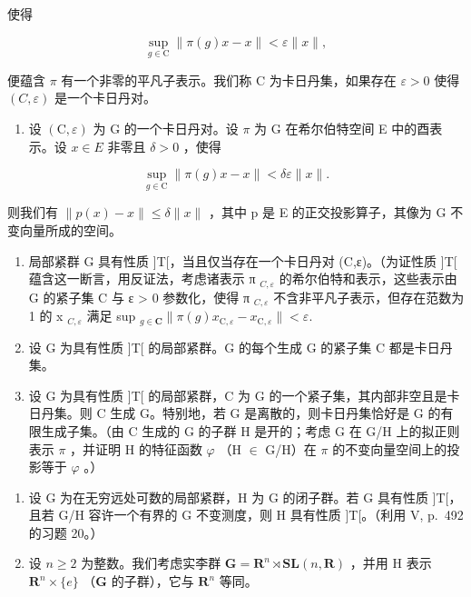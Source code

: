 使得

\[
\sup _ {g \in \mathrm{C}} \| \pi (g) x - x \| <   \varepsilon \| x \|,
\]

  便蕴含 \(\pi\) 有一个非零的平凡子表示。我们称 C 为卡日丹集，如果存在 \(\varepsilon > 0\) 使得 \((C, \varepsilon)\) 是一个卡日丹对。

\begin{enumerate}
\def\labelenumi{\alph{enumi})}
\tightlist
\item
  设 \((\mathrm{C}, \varepsilon)\) 为 G 的一个卡日丹对。设 \(\pi\) 为 G 在希尔伯特空间 E 中的酉表示。设 \(x \in E\) 非零且 \(\delta > 0\) ，使得
\end{enumerate}

\[
\sup _ {g \in \mathrm{C}} \| \pi (g) x - x \| <   \delta \varepsilon \| x \|.
\]

则我们有 \(\|p(x)-x\|\leqslant\delta\|x\|\) ，其中 p 是 E 的正交投影算子，其像为 G 不变向量所成的空间。

\begin{enumerate}
\def\labelenumi{\alph{enumi})}
\setcounter{enumi}{1}
\item
  局部紧群 G 具有性质 ]T[，当且仅当存在一个卡日丹对 (C,ε)。（为证性质 ]T[ 蕴含这一断言，用反证法，考虑诸表示 π \(_{C,\varepsilon}\) 的希尔伯特和表示，这些表示由 G 的紧子集 C 与 ε > 0 参数化，使得 π \(_{C,\varepsilon}\) 不含非平凡子表示，但存在范数为 1 的 x \(_{C,\varepsilon}\) 满足 sup \(_{g\in\mathbf{C}}\|\pi(g)x_{\mathrm{C},\varepsilon}-x_{\mathrm{C},\varepsilon}\|<\varepsilon.\)
\item
  设 G 为具有性质 ]T[ 的局部紧群。G 的每个生成 G 的紧子集 C 都是卡日丹集。
\item
  设 G 为具有性质 ]T[ 的局部紧群，C 为 G 的一个紧子集，其内部非空且是卡日丹集。则 C 生成 G。特别地，若 G 是离散的，则卡日丹集恰好是 G 的有限生成子集。（由 C 生成的 G 的子群 H 是开的；考虑 G 在 G/H 上的拟正则表示 \(\pi\) ，并证明 H 的特征函数 \(\varphi\) （H \(\in\) G/H）在 \(\pi\) 的不变向量空间上的投影等于 \(\varphi\) 。）
\end{enumerate}

\begin{enumerate}
\def\labelenumi{\arabic{enumi})}
\setcounter{enumi}{15}
\item
  设 G 为在无穷远处可数的局部紧群，H 为 G 的闭子群。若 G 具有性质 ]T[，且若 G/H 容许一个有界的 G 不变测度，则 H 具有性质 ]T[。（利用 V, p.~492 的习题 20。）
\item
  设 \(n \geqslant 2\) 为整数。我们考虑实李群 \(\mathbf{G} = \mathbf{R}^n \rtimes \mathbf{SL}(n, \mathbf{R})\) ，并用 H 表示 \(\mathbf{R}^n \times \{e\}\) （\(\mathbf{G}\) 的子群），它与 \(\mathbf{R}^n\) 等同。
\end{enumerate}

